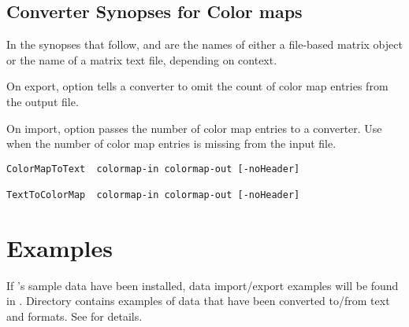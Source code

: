 \subsection{Converter Synopses for Color maps}

In the synopses that follow,  and
 are the names of either a \sr{} file-based
matrix object or the name of a matrix text file, depending on context.

On export, option  tells a converter to omit the
count of color map entries from the output file.

On import, option  passes the number of color map
entries to a converter.  Use  when the number of
color map entries is missing from the input file.

\begin{verbatim}
ColorMapToText  colormap-in colormap-out [-noHeader]

TextToColorMap  colormap-in colormap-out [-noHeader]
\end{verbatim}

\section{Examples}
\label{sec:converter_ex}

If \sr{}'s sample data have been installed, data import/export
examples will be found in .
Directory  contains examples of
data that have been converted to/from text and \sr{} formats.  See
 for details.

